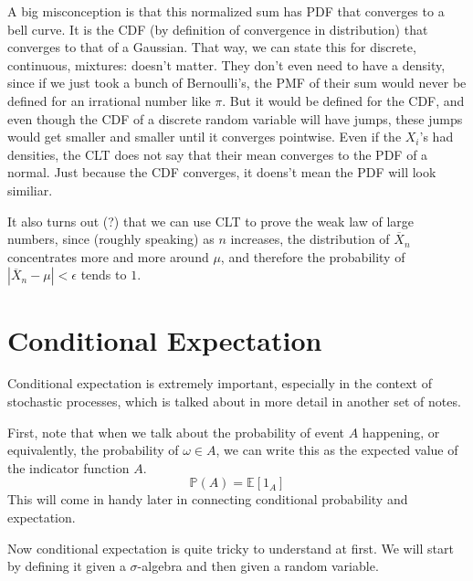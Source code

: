 \documentclass{article}
\begin{document}
    A big misconception is that this normalized sum has PDF that converges to a bell curve. It is the CDF (by definition of convergence in distribution) that converges to that of a Gaussian. That way, we can state this for discrete, continuous, mixtures: doesn't matter. They don't even need to have a density, since if we just took a bunch of Bernoulli's, the PMF of their sum would never be defined for an irrational number like $\pi$. But it would be defined for the CDF, and even though the CDF of a discrete random variable will have jumps, these jumps would get smaller and smaller until it converges pointwise. Even if the $X_i$'s had densities, the CLT does not say that their mean converges to the PDF of a normal. Just because the CDF converges, it doens't mean the PDF will look similiar. 

    It also turns out (?) that we can use CLT to prove the weak law of large numbers, since (roughly speaking) as $n$ increases, the distribution of $\overline{X}_n$ concentrates more and more around $\mu$, and therefore the probability of $|\overline{X}_n - \mu| < \epsilon$ tends to $1$. 

\section{Conditional Expectation}

    Conditional expectation is extremely important, especially in the context of stochastic processes, which is talked about in more detail in another set of notes. 

    First, note that when we talk about the probability of event $A$ happening, or equivalently, the probability of $\omega \in A$, we can write this as the expected value of the indicator function $A$. 
    \begin{equation}
      \mathbb{P}(A) = \mathbb{E}[1_A]
    \end{equation}
    This will come in handy later in connecting conditional probability and expectation. 

    Now conditional expectation is quite tricky to understand at first. We will start by defining it given a $\sigma$-algebra and then given a random variable. 
\end{document}
